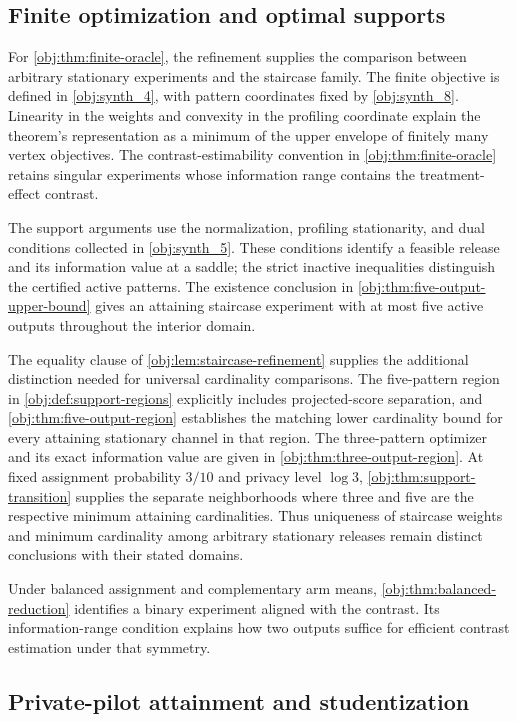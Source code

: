 \documentclass[11pt]{article}
\begin{document}
\subsection{Finite optimization and optimal supports}

For \cref{obj:thm:finite-oracle}, the refinement supplies the comparison between arbitrary stationary experiments and the staircase family. The finite objective is defined in \cref{obj:synth_4}, with pattern coordinates fixed by \cref{obj:synth_8}. Linearity in the weights and convexity in the profiling coordinate explain the theorem's representation as a minimum of the upper envelope of finitely many vertex objectives. The contrast-estimability convention in \cref{obj:thm:finite-oracle} retains singular experiments whose information range contains the treatment-effect contrast.

The support arguments use the normalization, profiling stationarity, and dual conditions collected in \cref{obj:synth_5}. These conditions identify a feasible release and its information value at a saddle; the strict inactive inequalities distinguish the certified active patterns. The existence conclusion in \cref{obj:thm:five-output-upper-bound} gives an attaining staircase experiment with at most five active outputs throughout the interior domain.

The equality clause of \cref{obj:lem:staircase-refinement} supplies the additional distinction needed for universal cardinality comparisons. The five-pattern region in \cref{obj:def:support-regions} explicitly includes projected-score separation, and \cref{obj:thm:five-output-region} establishes the matching lower cardinality bound for every attaining stationary channel in that region. The three-pattern optimizer and its exact information value are given in \cref{obj:thm:three-output-region}. At fixed assignment probability \(3/10\) and privacy level \(\log 3\), \cref{obj:thm:support-transition} supplies the separate neighborhoods where three and five are the respective minimum attaining cardinalities. Thus uniqueness of staircase weights and minimum cardinality among arbitrary stationary releases remain distinct conclusions with their stated domains.

Under balanced assignment and complementary arm means, \cref{obj:thm:balanced-reduction} identifies a binary experiment aligned with the contrast. Its information-range condition explains how two outputs suffice for efficient contrast estimation under that symmetry.

\subsection{Private-pilot attainment and studentization}
\end{document}
